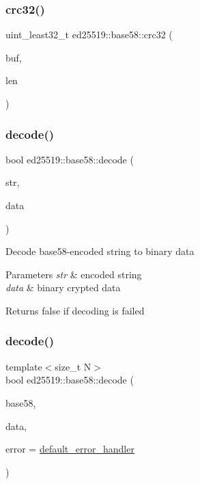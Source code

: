 \subsubsection{\texorpdfstring{crc32()}{crc32()}}
{\footnotesize\ttfamily uint\+\_\+least32\+\_\+t ed25519\+::base58\+::crc32 (\begin{DoxyParamCaption}\item[{unsigned char $\ast$}]{buf,  }\item[{size\+\_\+t}]{len }\end{DoxyParamCaption})}

\mbox{\label{namespaceed25519_1_1base58_ac8132589f5098b8de74d2dfb72f7bf65}} 
\subsubsection{\texorpdfstring{decode()}{decode()}\hspace{0.1cm}{\footnotesize\ttfamily [1/2]}}
{\footnotesize\ttfamily bool ed25519\+::base58\+::decode (\begin{DoxyParamCaption}\item[{const std\+::string \&}]{str,  }\item[{std\+::vector$<$ unsigned char $>$ \&}]{data }\end{DoxyParamCaption})}

Decode base58-\/encoded string to binary data 
\begin{DoxyParams}{Parameters}
{\em str} & encoded string \\
\hline
{\em data} & binary crypted data \\
\hline
\end{DoxyParams}
\begin{DoxyReturn}{Returns}
false if decoding is failed 
\end{DoxyReturn}
\mbox{\label{namespaceed25519_1_1base58_a97f34fe5ffdd0da677a4cef6be3a5a60}} 
\subsubsection{\texorpdfstring{decode()}{decode()}\hspace{0.1cm}{\footnotesize\ttfamily [2/2]}}
{\footnotesize\ttfamily template$<$size\+\_\+t N$>$ \\
bool ed25519\+::base58\+::decode (\begin{DoxyParamCaption}\item[{const std\+::string \&}]{base58,  }\item[{std\+::array$<$ unsigned char, N $>$ \&}]{data,  }\item[{const \mbox{\hyperlink{namespaceed25519_a6ba572942b3c18591fc869d52a6b16e6}{Error\+Handler}} \&}]{error = {\ttfamily \mbox{\hyperlink{namespaceed25519_a7c7bb6ed17541162959c33ed3e3b15fb}{default\+\_\+error\+\_\+handler}}} }\end{DoxyParamCaption})}

